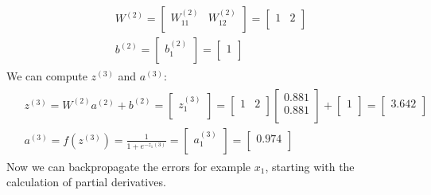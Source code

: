 \documentclass[leqno]{article}
\begin{document}
\begin{gather*}
\begin{split}
&W^{(2)} =
  \begin{bmatrix}
  W_{11}^{(2)} & W_{12}^{(2)}\\
  \end{bmatrix}
  =
  \begin{bmatrix}
  1 & 2\\
  \end{bmatrix}
\\
&b^{(2)} =
   \begin{bmatrix}
  b_1^{(2)} \\
  \end{bmatrix}
  =
  \begin{bmatrix}
  1 \\
  \end{bmatrix}
\end{split}
\end{gather*}
We can compute $z^{(3)}$ and $a^{(3)}$:
\begin{gather*}
\begin{split}
&z^{(3)} = W^{(2)}a^{(2)} + b^{(2)} =
 \begin{bmatrix}
  z_1^{(3)}\\
 \end{bmatrix}
 =
 \begin{bmatrix}
   1 & 2\\
  \end{bmatrix}
 \begin{bmatrix}
   0.881\\
   0.881\\ 
  \end{bmatrix} 
  +
   \begin{bmatrix}
   1\\
  \end{bmatrix}
  =
 \begin{bmatrix}
   3.642\\ 
  \end{bmatrix}
\\
&a^{(3)} = f(z^{(3)}) = \frac{1}{1 + e^{-z_1{(3)}}} =
 \begin{bmatrix}
   a_1^{(3)}\\ 
  \end{bmatrix}
 =
 \begin{bmatrix}
   0.974\\ 
  \end{bmatrix}
\end{split}
\end{gather*}
Now we can backpropagate the errors for example $x_1$, starting with the calculation of partial derivatives. 
\end{document}
